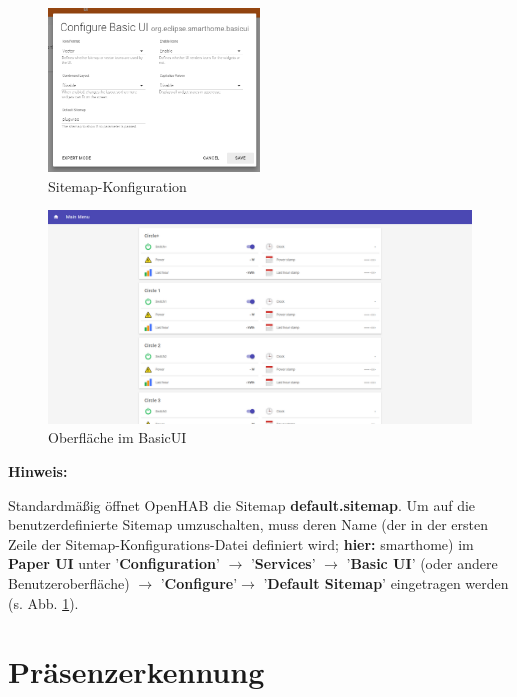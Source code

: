 \begin{figure}[H]
	\centering
	\includegraphics[width=0.5\textwidth]{Bilder/sitemapcfg}
	\caption{Sitemap-Konfiguration}
	\label{fig:sitemapcfg}
\end{figure}

\begin{figure}[H]
	\centering
	\includegraphics[width=1\textwidth]{Bilder/ohMain}
	\caption{Oberfläche im BasicUI}
	\label{fig:ohbasic}
\end{figure}

\newpage



\textbf{Hinweis: }

Standardmäßig öffnet OpenHAB die Sitemap \textbf{default.sitemap}. Um auf die benutzerdefinierte Sitemap umzuschalten, muss deren Name (der in der ersten Zeile der Sitemap-Konfigurations-Datei definiert wird; \textbf{hier: } smarthome) im \textbf{Paper UI} unter '\textbf{Configuration}' $\rightarrow$  '\textbf{Services}' $\rightarrow$  '\textbf{Basic UI}' (oder andere Benutzeroberfläche) $\rightarrow$  '\textbf{Configure}'$\rightarrow$  '\textbf{Default Sitemap}' eingetragen werden (s. Abb. \ref{fig:sitemapcfg}). 

\newpage

\section{Präsenzerkennung}
